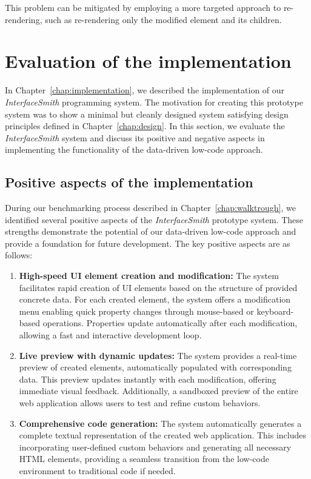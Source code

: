 \begin{enumerate}
	      This problem can be mitigated by employing a more targeted approach to re-rendering, such as re-rendering only the modified element and its children.

\end{enumerate}

\medskip
\section{Evaluation of the implementation}

In Chapter~\ref{chap:implementation}, we described the implementation of our \emph{InterfaceSmith} programming system.
The motivation for creating this prototype system was to show a minimal but cleanly designed system satisfying design principles defined in Chapter~\ref{chap:design}.
In this section, we evaluate the \emph{InterfaceSmith} system and discuss its positive and negative aspects in implementing the functionality of the data-driven low-code approach.

\subsection{Positive aspects of the implementation}
During our benchmarking process described in Chapter~\ref{chap:walktrough},
we identified several positive aspects of the \emph{InterfaceSmith} prototype system.
These strengths demonstrate the potential of our data-driven low-code approach and provide a foundation for future development.
The key positive aspects are as follows:
\begin{enumerate}
	\item \textbf{High-speed UI element creation and modification:}
	      The system facilitates rapid creation of UI elements based on the structure of provided concrete data.
	      For each created element, the system offers a modification menu enabling quick property changes through mouse-based or keyboard-based operations.
	      Properties update automatically after each modification, allowing a fast and interactive development loop.
	\item \textbf{Live preview with dynamic updates:}
	      The system provides a real-time preview of created elements, automatically populated with corresponding data.
	      This preview updates instantly with each modification, offering immediate visual feedback.
	      Additionally, a sandboxed preview of the entire web application allows users to test and refine custom behaviors.
	\item \textbf{Comprehensive code generation:}
	      The system automatically generates a complete textual representation of the created web application.
	      This includes incorporating user-defined custom behaviors and generating all necessary HTML elements,
	      providing a seamless transition from the low-code environment to traditional code if needed.
\end{enumerate}


